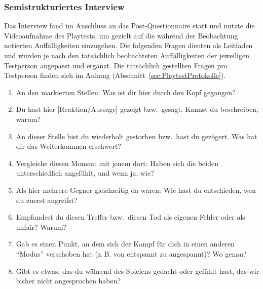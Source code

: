 \documentclass[../Main.tex]{subfiles}
\begin{document}
\subsubsection{Semistrukturiertes Interview} \label{sec:Interview}

Das Interview fand im Anschluss an das Post-Questionnaire statt und nutzte die Videoaufnahme des Playtests, um gezielt auf die während der Beobachtung notierten Auffälligkeiten einzugehen. Die folgenden Fragen dienten als Leitfaden und wurden je nach den tatsächlich beobachteten Auffälligkeiten der jeweiligen Testperson angepasst und ergänzt. Die tatsächlich gestellten Fragen pro Testperson finden sich im Anhang (Abschnitt~\ref{sec:PlaytestProtokolle}).

\begin{enumerate}[label=\textbf{I\arabic*}, leftmargin=1.5cm, itemsep=0.5em]
    \item An den markierten Stellen: Was ist dir hier durch den Kopf gegangen?
    \item Du hast hier [Reaktion/Aussage] gezeigt bzw.\ gesagt. Kannst du beschreiben, warum?
    \item An dieser Stelle bist du wiederholt gestorben bzw.\ hast du gezögert. Was hat dir das Weiterkommen erschwert?
    \item Vergleiche diesen Moment mit jenem dort: Haben sich die beiden unterschiedlich angefühlt, und wenn ja, wie?
    \item Als hier mehrere Gegner gleichzeitig da waren: Wie hast du entschieden, wen du zuerst angreifst?
    \item Empfandest du diesen Treffer bzw.\ diesen Tod als eigenen Fehler oder als unfair? Warum?
    \item Gab es einen Punkt, an dem sich der Kampf für dich in einen anderen \enquote{Modus} verschoben hat (z.\,B. von entspannt zu angespannt)? Wo genau?
    \item Gibt es etwas, das du während des Spielens gedacht oder gefühlt hast, das wir bisher nicht angesprochen haben?
\end{enumerate}
\end{document}
